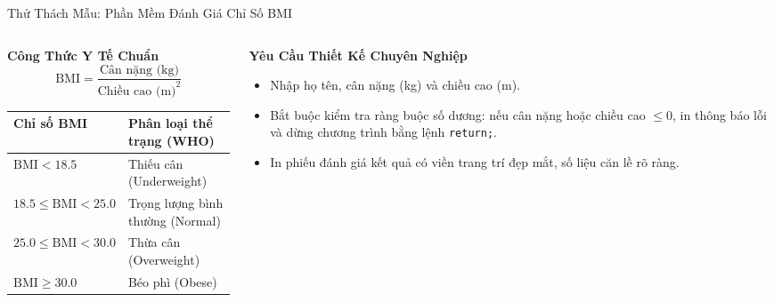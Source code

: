 \documentclass[aspectratio=169, 10pt]{beamer}
\begin{document}
\begin{frame}{Thử Thách Mẫu: Phần Mềm Đánh Giá Chỉ Số BMI}
  \begin{columns}[T]
    \begin{column}{0.48\textwidth}
      \begin{block}{\textbf{Công Thức Y Tế Chuẩn}}
        \[ \text{BMI} = \frac{\text{Cân nặng (kg)}}{\text{Chiều cao (m)}^2} \]
      \end{block}
      \begin{table}[h]
        \centering
        \scriptsize
        \begin{tabularx}{\textwidth}{lX}
          \toprule
          \textbf{Chỉ số BMI} & \textbf{Phân loại thể trạng (WHO)} \\
          \midrule
          $\text{BMI} < 18.5$ & Thiếu cân (Underweight) \\
          \addlinespace
          $18.5 \le \text{BMI} < 25.0$ & Trọng lượng bình thường (Normal) \\
          \addlinespace
          $25.0 \le \text{BMI} < 30.0$ & Thừa cân (Overweight) \\
          \addlinespace
          $\text{BMI} \ge 30.0$ & Béo phì (Obese) \\
          \bottomrule
        \end{tabularx}
      \end{table}
    \end{column}
    \begin{column}{0.48\textwidth}
      \begin{exampleblock}{\textbf{Yêu Cầu Thiết Kế Chuyên Nghiệp}}
        \begin{itemize}
          \item Nhập họ tên, cân nặng (kg) và chiều cao (m).
          \item Bắt buộc kiểm tra ràng buộc số dương: nếu cân nặng hoặc chiều cao $\le 0$, in thông báo lỗi và dừng chương trình bằng lệnh \texttt{return;}.
          \item In phiếu đánh giá kết quả có viền trang trí đẹp mắt, số liệu căn lề rõ ràng.
        \end{itemize}
      \end{exampleblock}
    \end{column}
  \end{columns}
\end{frame}
\end{document}
